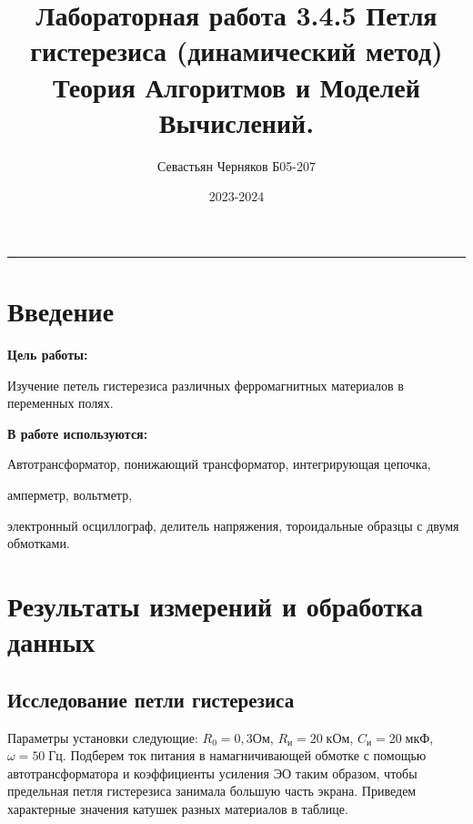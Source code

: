 \documentclass[a4paper,12pt]{article}
\title{
    Лабораторная работа 3.4.5 Петля гистерезиса (динамический метод) \\
    Теория Алгоритмов и Моделей Вычислений.\\}
\author{Севастьян Черняков Б05-207}
\date{2023-2024}
\begin{document}
\maketitle



\vspace{15pt}

\hrule 
\vspace{15pt}

\section{Введение}

\textbf{Цель работы:} 

	Изучение петель гистерезиса различных ферромагнитных
материалов в переменных полях.


\textbf{В работе используются:} 

Автотрансформатор, понижающий трансформатор, интегрирующая цепочка, 

амперметр, вольтметр, 

электронный
осциллограф, делитель напряжения, тороидальные образцы с двумя обмотками.


\section{Результаты измерений и обработка данных}

\subsection{Исследование петли гистерезиса}
Параметры установки следующие: $R_0 = 0,3Ом$, $R_и = 20 \; кОм$, $C_и = 20 \; мкФ$, $\omega = 50\; Гц$. 
Подберем ток питания в намагничивающей обмотке с помощью автотрансформатора и коэффициенты усиления ЭО
таким образом, чтобы предельная петля гистерезиса занимала большую часть экрана. Приведем характерные 
значения катушек разных материалов в таблице.



\vspace{15pt}
\end{document}
